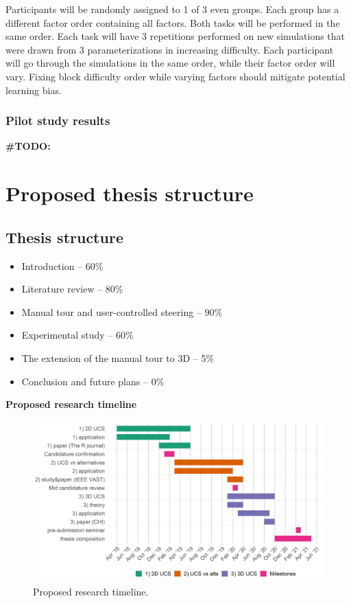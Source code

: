 \documentclass[
  11,
]{article}
\providecommand{\tightlist}{%
  \setlength{\itemsep}{0pt}\setlength{\parskip}{0pt}}
\begin{document}
Participants will be randomly assigned to 1 of 3 even groups. Each group has a different factor order containing all factors. Both tasks will be performed in the same order. Each task will have 3 repetitions performed on new simulations that were drawn from 3 parameterizations in increasing difficulty. Each participant will go through the simulations in the same order, while their factor order will vary. Fixing block difficulty order while varying factors should mitigate potential learning bias.

\hypertarget{pilot-study-results}{%
\subsubsection{Pilot study results}\label{pilot-study-results}}

\textbf{\#TODO:}

\hypertarget{proposed-thesis-structure}{%
\section{Proposed thesis structure}\label{proposed-thesis-structure}}

\hypertarget{thesis-structure}{%
\subsection{Thesis structure}\label{thesis-structure}}

\begin{itemize}
\tightlist
\item
  Introduction -- 60\%
\item
  Literature review -- 80\%
\item
  Manual tour and user-controlled steering -- 90\%
\item
  Experimental study -- 60\%
\item
  The extension of the manual tour to 3D -- 5\%
\item
  Conclusion and future plans -- 0\%
\end{itemize}

\textbf{Proposed research timeline}

\begin{figure}[h]

{\centering \includegraphics[width=1\linewidth,]{figures/phd_timeline} 

}

\caption{Proposed research timeline.}\label{fig:timeline}
\end{figure}
\end{document}

